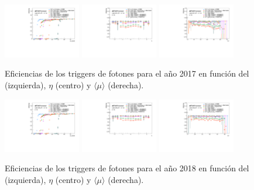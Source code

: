\begin{figure}[!htpb]
  \centering
      {\includegraphics[width=0.30\textwidth]{images/trigger/2017_eff_et.pdf}}
      {\includegraphics[width=0.30\textwidth]{images/trigger/2017_eff_eta_zoom.pdf}}
      {\includegraphics[width=0.30\textwidth]{images/trigger/2017_eff_mu_zoom.pdf}}
      \caption{Eficiencias de los triggers de fotones para el año 2017 en función del \ET (izquierda), $\eta$ (centro) y $\langle\mu\rangle$ (derecha).}
      \label{fig:photon_trig_eff_2017}
\end{figure}
\begin{figure}[!htpb]
  \centering
      {\includegraphics[width=0.30\textwidth]{images/trigger/2018_eff_et.pdf}}
      {\includegraphics[width=0.30\textwidth]{images/trigger/2018_eff_eta_zoom.pdf}}
      {\includegraphics[width=0.30\textwidth]{images/trigger/2018_eff_mu_zoom.pdf}}
      \caption{Eficiencias de los triggers de fotones para el año 2018 en función del \ET (izquierda), $\eta$ (centro) y $\langle\mu\rangle$ (derecha).}
      \label{fig:photon_trig_eff_2018}
\end{figure}


